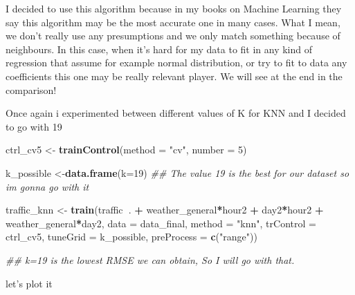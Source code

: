 \documentclass[
]{article}
\newenvironment{Shaded}{\begin{snugshade}}{\end{snugshade}}
\newcommand{\CommentTok}[1]{\textcolor[rgb]{0.56,0.35,0.01}{\textit{#1}}}
\newcommand{\DataTypeTok}[1]{\textcolor[rgb]{0.13,0.29,0.53}{#1}}
\newcommand{\DecValTok}[1]{\textcolor[rgb]{0.00,0.00,0.81}{#1}}
\newcommand{\KeywordTok}[1]{\textcolor[rgb]{0.13,0.29,0.53}{\textbf{#1}}}
\newcommand{\NormalTok}[1]{#1}
\newcommand{\OperatorTok}[1]{\textcolor[rgb]{0.81,0.36,0.00}{\textbf{#1}}}
\newcommand{\StringTok}[1]{\textcolor[rgb]{0.31,0.60,0.02}{#1}}
\begin{document}
I decided to use this algorithm because in my books on Machine Learning
they say this algorithm may be the most accurate one in many cases. What
I mean, we don't really use any presumptions and we only match something
because of neighbours. In this case, when it's hard for my data to fit
in any kind of regression that assume for example normal distribution,
or try to fit to data any coefficients this one may be really relevant
player. We will see at the end in the comparison!

Once again i experimented between different values of K for KNN and I
decided to go with 19

\begin{Shaded}
\begin{Highlighting}[]
\NormalTok{ctrl_cv5 <-}\StringTok{ }\KeywordTok{trainControl}\NormalTok{(}\DataTypeTok{method =} \StringTok{"cv"}\NormalTok{,}
                         \DataTypeTok{number =} \DecValTok{5}\NormalTok{)}

\NormalTok{k_possible <-}\KeywordTok{data.frame}\NormalTok{(}\DataTypeTok{k=}\DecValTok{19}\NormalTok{) }\CommentTok{## The value 19 is the best for our dataset so im gonna go with it}

\NormalTok{traffic_knn <-}\StringTok{ }
\StringTok{  }\KeywordTok{train}\NormalTok{(traffic}\OperatorTok{~}\NormalTok{. }\OperatorTok{+}\StringTok{ }\NormalTok{weather_general}\OperatorTok{*}\NormalTok{hour2  }\OperatorTok{+}\StringTok{ }\NormalTok{day2}\OperatorTok{*}\NormalTok{hour2 }\OperatorTok{+}\StringTok{ }\NormalTok{weather_general}\OperatorTok{*}\NormalTok{day2, }
        \DataTypeTok{data =}\NormalTok{ data_final,}
        \DataTypeTok{method =} \StringTok{"knn"}\NormalTok{,}
        \DataTypeTok{trControl =}\NormalTok{ ctrl_cv5,}
        \DataTypeTok{tuneGrid =}\NormalTok{ k_possible,}
        \DataTypeTok{preProcess =} \KeywordTok{c}\NormalTok{(}\StringTok{"range"}\NormalTok{))}

\CommentTok{## k=19 is the lowest RMSE we can obtain, So I will go with that.}
\end{Highlighting}
\end{Shaded}

let's plot it
\end{document}
